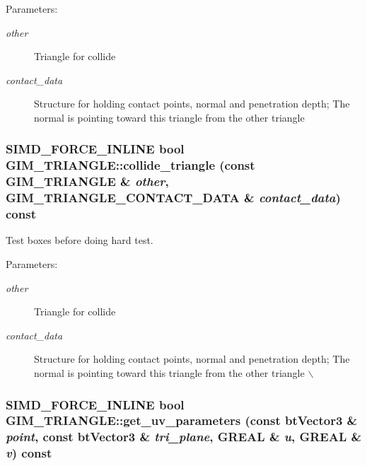 \begin{Desc}
\item[Parameters:]
\begin{description}
\item[{\em other}]Triangle for collide \item[{\em contact\_\-data}]Structure for holding contact points, normal and penetration depth; The normal is pointing toward this triangle from the other triangle \end{description}
\end{Desc}
\hypertarget{class_g_i_m___t_r_i_a_n_g_l_e_42749c17088408842a97534559b9d1f2}{
\subsubsection[collide\_\-triangle]{\setlength{\rightskip}{0pt plus 5cm}SIMD\_\-FORCE\_\-INLINE bool GIM\_\-TRIANGLE::collide\_\-triangle (const {\bf GIM\_\-TRIANGLE} \& {\em other}, \/  {\bf GIM\_\-TRIANGLE\_\-CONTACT\_\-DATA} \& {\em contact\_\-data}) const}}
\label{class_g_i_m___t_r_i_a_n_g_l_e_42749c17088408842a97534559b9d1f2}


Test boxes before doing hard test. 

\begin{Desc}
\item[Parameters:]
\begin{description}
\item[{\em other}]Triangle for collide \item[{\em contact\_\-data}]Structure for holding contact points, normal and penetration depth; The normal is pointing toward this triangle from the other triangle $\backslash$ \end{description}
\end{Desc}
\hypertarget{class_g_i_m___t_r_i_a_n_g_l_e_cbd27931f5431435ecce5576de18924b}{
\subsubsection[get\_\-uv\_\-parameters]{\setlength{\rightskip}{0pt plus 5cm}SIMD\_\-FORCE\_\-INLINE bool GIM\_\-TRIANGLE::get\_\-uv\_\-parameters (const btVector3 \& {\em point}, \/  const btVector3 \& {\em tri\_\-plane}, \/  GREAL \& {\em u}, \/  GREAL \& {\em v}) const}}
\label{class_g_i_m___t_r_i_a_n_g_l_e_cbd27931f5431435ecce5576de18924b}


